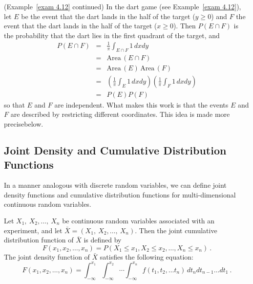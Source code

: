 \begin{example}(Example~\ref{exam 4.12} continued){\label{exam 4.15}}
In the dart game (see Example~\ref{exam 4.12}), let $E$ be the event that the
dart lands in the  half of the target ($y \geq 0$) and $F$ the
event that the dart lands in the  half of the target ($x \geq
0$).  Then $P(E \cap F)$ is the probability that the dart lies in the first
quadrant of the target, and
\begin{eqnarray*}
P(E \cap F) & = & \frac 1\pi \int_{E \cap F} 1\,dxdy \\
            & = & \mbox{Area}\,(E\cap F)         \\
            & = & \mbox{Area}\,(E)\,\mbox{Area}\,(F)  \\
            & = & \left(\frac 1\pi \int_E 1\,dxdy\right) \left(\frac 1\pi \int_F
1\,dxdy\right) \\
            & = & P(E)P(F)
\end{eqnarray*}
so that $E$ and $F$ are independent.  What makes this work is that the events
$E$ and $F$ are described by restricting different coordinates.  This idea is made 
more precise\linebreak[4] below.
\end{example}

\subsection*{Joint Density and Cumulative Distribution Functions}

In a manner analogous with discrete random variables, we can define joint density
functions and cumulative distribution functions for multi-dimensional continuous random
variables.  

\begin{definition}\label{def 4.5}
Let $X_1,~X_2, \ldots,~X_n$ be continuous random variables associated with an experiment, and
let ${\bar X} = (X_1,~X_2, \ldots,~X_n)$.  Then the joint cumulative
distribution function of
${\bar X}$ is defined by
$$F(x_1, x_2, \ldots, x_n) = P(X_1 \le x_1, X_2 \le x_2, \ldots, X_n \le x_n)\ .$$
The joint density function of
${\bar X}$ satisfies the following equation:
$$F(x_1, x_2, \ldots, x_n) = \int_{-\infty}^{x_1} \int_{-\infty}^{x_2} \cdots
\int_{-\infty}^{x_n} f(t_1, t_2, \ldots t_n)\,dt_ndt_{n-1}\ldots dt_1\ .$$
\end{definition}

